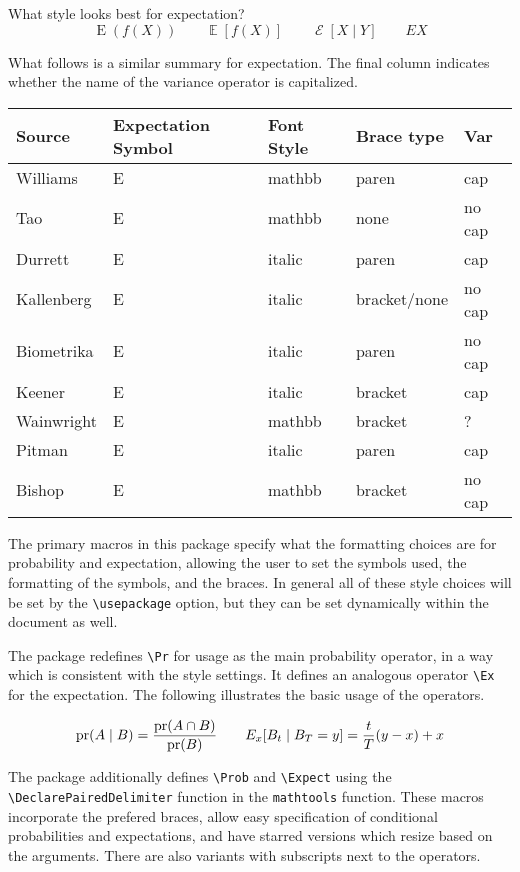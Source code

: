 \documentclass[11pt,letterpaper]{ltxguide}
\begin{document}
What style looks best for expectation?
\[
    \operatorname E(f(X)) \qquad \operatorname{\mathbb E}[f(X)] \qquad \operatorname{\mathcal E}[X\mid Y] \qquad EX
\]

What follows is a similar summary for expectation.  The final column indicates whether the name of the variance operator is capitalized.

\begin{tabular}{l p{2cm} p{1.5cm} p{2cm} p{1.5cm} }
Source & Expectation Symbol&  Font Style & Brace type & Var \\
\hline
Williams & E & mathbb &  paren & cap\\
Tao & E & mathbb & none & no cap \\
Durrett & E & italic & paren & cap \\
Kallenberg & E & italic & bracket/none & no cap \\
Biometrika & E & italic & paren & no cap \\
Keener & E & italic & bracket & cap \\
Wainwright & E & mathbb & bracket & ?\\
Pitman & E & italic & paren & cap\\
Bishop & E & mathbb & bracket & no cap\\
\hline
\end{tabular}


The primary macros in this package specify what the formatting choices are for probability and expectation, allowing the user to set the symbols used, the formatting of the symbols, and the braces.  In general all of these style choices will be set by the \verb+\usepackage+ option, but they can be set dynamically within the document as well.  

The package redefines \verb+\Pr+ for usage as the main probability operator, in a way which is consistent with the style settings.  It defines an analogous operator \verb+\Ex+ for the expectation.  The following illustrates the basic usage of the operators.

\[ \operatorname{pr}( A \mid B ) = \frac{\operatorname{pr}(A \cap B)}{\operatorname{pr}(B)} \qquad {E}_x[ B_t \mid B_T =y ] = \frac t T (y-x) + x
\]

The package additionally defines \verb+\Prob+ and \verb+\Expect+ using the \verb+\DeclarePairedDelimiter+ function in the \texttt{mathtools} function.  These macros incorporate the prefered braces, allow easy specification of conditional probabilities and expectations, and have starred versions which resize based on the arguments.  There are also variants with subscripts next to the operators.
\end{document}
